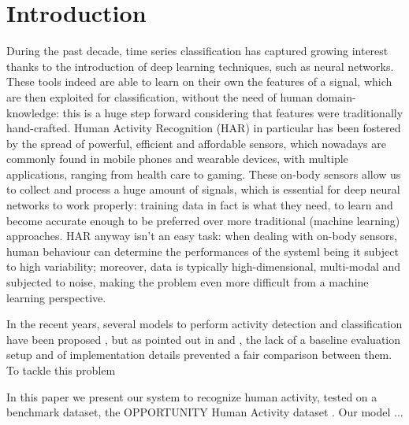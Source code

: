 
\section{Introduction}
\label{sec:introduction}

During the past decade, time series classification has captured growing interest thanks to the introduction of deep learning techniques, such as neural networks. These tools indeed are able to learn on their own the features of a signal, which are then exploited for classification, without the need of human domain-knowledge: this is a huge step forward considering that features were traditionally hand-crafted. \cite{someone}
Human Activity Recognition (HAR) in particular has been fostered by the spread of powerful, efficient and affordable sensors, which nowadays are commonly found in mobile phones and wearable devices, with multiple applications, ranging from health care to gaming. \cite{someone}
These on-body sensors allow us to collect and process a huge amount of signals, which is essential for deep neural networks to work properly: training data in fact is what they need, to learn and become accurate enough to be preferred over more traditional (machine learning) approaches.
HAR anyway isn't an easy task: when dealing with on-body sensors, human behaviour can determine the performances of the systeml being it subject to high variability; moreover, data is typically high-dimensional, multi-modal and subjected to noise, making the problem even more difficult from a machine learning perspective.

In the recent years, several models to perform activity detection and classification have been proposed \cite{someone}, but as pointed out in \cite{OpportunityDataset} and \cite{Li-2018}, the lack of a baseline evaluation setup and of implementation details prevented a fair comparison between them.
To tackle this problem


In this paper we present our system to recognize human activity, tested on a benchmark dataset, the OPPORTUNITY Human Activity dataset \cite{bibid}. Our model ...


\\

